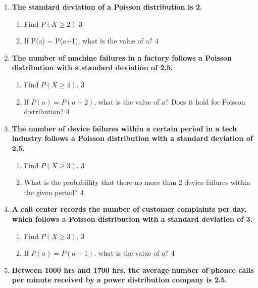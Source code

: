\documentclass[a4paper,oneside]{book}
\begin{document}
\begin{enumerate}

 \item
	  \textbf{The standard deviation of a Poisson distribution is 2.} 
  
  \begin{enumerate}
    \item  
	Find $P(X\ge 2)$ \hfill 3
    \item
	If P(a) = P(a+1), what is the value of a? \hfill 4
  \end{enumerate}
  
  \item  
  \textbf{The number of machine failures in a factory follows a Poisson distribution with a standard deviation of 2.5.}  

  \begin{enumerate}  
    \item  
      Find $P(X \geq 4)$. \hfill 3  
    \item  
      If $P(a) = P(a+2)$, what is the value of $a$? Does it hold for Poisson distribution?  \hfill 4  
  \end{enumerate}  
  
    \item  
  \textbf{The number of device failures within a certain period in a tech industry follows a Poisson distribution with a standard deviation of 2.5.}  

  \begin{enumerate}  
    \item  
      Find $P(X \geq 3)$. \hfill 3  
    \item  
      What is the probabiility that there no more than 2 device failures within the given period?  \hfill 4  
  \end{enumerate}   

\item  
  \textbf{A call center records the number of customer complaints per day, which follows a Poisson distribution with a standard deviation of 3.}  

  \begin{enumerate}  
    \item  
      Find $P(X \geq 3)$. \hfill 3  
    \item  
      If $P(a) = P(a+1)$, what is the value of $a$? \hfill 4  
  \end{enumerate}  


   \item
	  \textbf{Between 1000 hrs and 1700 hrs, the average number of phonce calls per minute received by a power distribution company is 2.5. } 
  

\end{enumerate}
\end{document}
